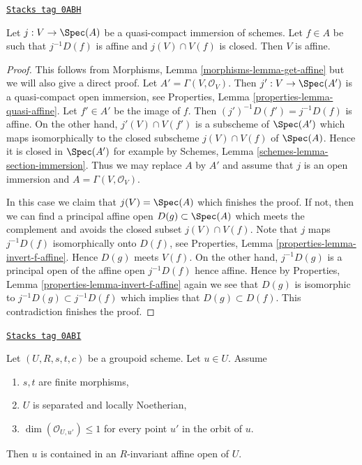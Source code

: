 \begin{lemma}
\label{more-groupoids-lemma-get-affine}
\href{https://stacks.math.columbia.edu/tag/0ABH}{\texttt{Stacks tag 0ABH}}

Let $j : V \to \Spec(A)$ be a quasi-compact immersion of schemes.
Let $f \in A$ be such that $j^{-1}D(f)$ is affine and $j(V) \cap V(f)$
is closed. Then $V$ is affine.
\end{lemma}

\begin{proof}
This follows from Morphisms, Lemma \ref{morphisms-lemma-get-affine}
but we will also give a direct proof.
Let $A' = \Gamma(V, \mathcal{O}_V)$. Then $j' : V \to \Spec(A')$ is a
quasi-compact open immersion, see
Properties, Lemma \ref{properties-lemma-quasi-affine}.
Let $f' \in A'$ be the image of $f$. Then $(j')^{-1}D(f') = j^{-1}D(f)$
is affine. On the other hand, $j'(V) \cap V(f')$ is a subscheme of
$\Spec(A')$ which maps isomorphically to the closed subscheme
$j(V) \cap V(f)$ of $\Spec(A)$. Hence it is closed in $\Spec(A')$
for example by Schemes, Lemma \ref{schemes-lemma-section-immersion}.
Thus we may replace $A$ by $A'$ and assume that $j$ is an open immersion
and $A = \Gamma(V, \mathcal{O}_V)$.

\medskip\noindent
In this case we claim that $j(V) = \Spec(A)$ which finishes the proof.
If not, then we can find a principal affine open $D(g) \subset \Spec(A)$
which meets the complement and avoids the closed subset $j(V) \cap V(f)$.
Note that $j$ maps $j^{-1}D(f)$ isomorphically onto $D(f)$, see
Properties, Lemma \ref{properties-lemma-invert-f-affine}.
Hence $D(g)$ meets $V(f)$. On the other hand, $j^{-1}D(g)$
is a principal open of the affine open $j^{-1}D(f)$ hence affine.
Hence by
Properties, Lemma \ref{properties-lemma-invert-f-affine}
again we see that $D(g)$ is isomorphic to $j^{-1}D(g) \subset j^{-1}D(f)$
which implies that $D(g) \subset D(f)$. This contradiction finishes
the proof.
\end{proof}

\begin{lemma}
\label{more-groupoids-lemma-find-affine-codimension-1}
\href{https://stacks.math.columbia.edu/tag/0ABI}{\texttt{Stacks tag 0ABI}}

Let $(U, R, s, t, c)$ be a groupoid scheme. Let $u \in U$. Assume
\begin{enumerate}
\item $s, t$ are finite morphisms,
\item $U$ is separated and locally Noetherian,
\item $\dim(\mathcal{O}_{U, u'}) \leq 1$ for every point $u'$
in the orbit of $u$.
\end{enumerate}
Then $u$ is contained in an $R$-invariant affine open of $U$.
\end{lemma}

